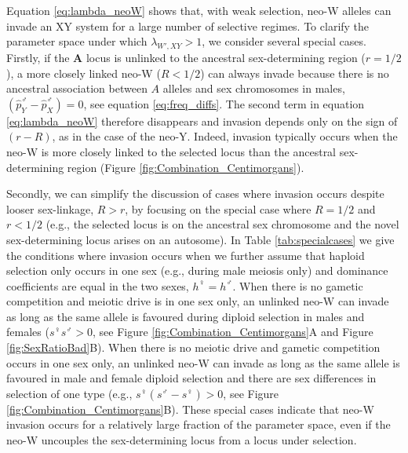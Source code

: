 \documentclass[12pt]{article}
\begin{document}
Equation \eqref{eq:lambda_neoW} shows that, with weak selection, neo-W alleles can invade an XY system for a large number of selective regimes. 
To clarify the parameter space under which $\lambda_{W',XY}>1$, we consider several special cases. 
Firstly, if the \textbf{A} locus is unlinked to the ancestral sex-determining region ($r=1/2$), a more closely linked neo-W ($R<1/2$) can always invade because there is no ancestral association between $A$ alleles and sex chromosomes in males, $\left( \hat{p}^\male_Y-\hat{p}^\male_X \right)=0$, see equation \eqref{eq:freq_diffs}. 
The second term in equation \eqref{eq:lambda_neoW} therefore disappears and invasion depends only on the sign of $(r-R)$, as in the case of the neo-Y. 
Indeed, invasion typically occurs when the neo-W is more closely linked to the selected locus than the ancestral sex-determining region (Figure \ref{fig:Combination_Centimorgans}).

Secondly, we can simplify the discussion of cases where invasion occurs despite looser sex-linkage, $R>r$, by focusing on the special case where $R=1/2$ and $r<1/2$ (e.g., the selected locus is on the ancestral sex chromosome and the novel sex-determining locus arises on an autosome). 
In Table \ref{tab:specialcases} we give the conditions where invasion occurs when we further assume that haploid selection only occurs in one sex (e.g., during male meiosis only) and dominance coefficients are equal in the two sexes, $h^\female=h^\male$. 
When there is no gametic competition and meiotic drive is in one sex only, an unlinked neo-W can invade as long as the same allele is favoured during diploid selection in males and females ($s^\female s^\male>0$, see Figure \ref{fig:Combination_Centimorgans}A and Figure \ref{fig:SexRatioBad}B). %
When there is no meiotic drive and gametic competition occurs in one sex only, an unlinked neo-W can invade as long as the same allele is favoured in male and female diploid selection and there are sex differences in selection of one type (e.g., $s^\female(s^\male-s^\female)>0$, see Figure \ref{fig:Combination_Centimorgans}B). %
These special cases indicate that neo-W invasion occurs for a relatively large fraction of the parameter space, even if the neo-W uncouples the sex-determining locus from a locus under selection. 
\end{document}
